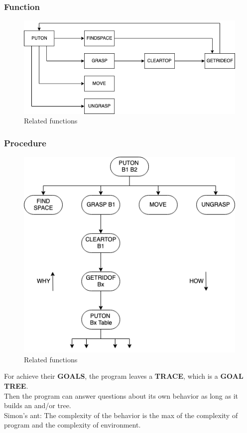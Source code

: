 \documentclass[12pt]{book}
\begin{document}
\subsubsection{Function}
\begin{figure}[ht]
	\centering
	\includegraphics[scale=0.8]{Figure/Figure3_2.png}
	\caption{Related functions}
\end{figure}
\newpage
\subsubsection{Procedure}
\begin{figure}[ht]
	\centering
	\includegraphics[scale=0.55]{Figure/Figure3_3.png}
	\caption{Related functions}
\end{figure}
\indent For achieve their \textbf{GOALS}, the program leaves a \textbf{TRACE}, which is a \textbf{GOAL TREE}.\\ \indent Then the program can answer questions about its own behavior as long as it builds an and/or tree.\\
\indent Simon's ant: The complexity of the behavior is the max of the complexity of program and the complexity of environment.
\end{document}

